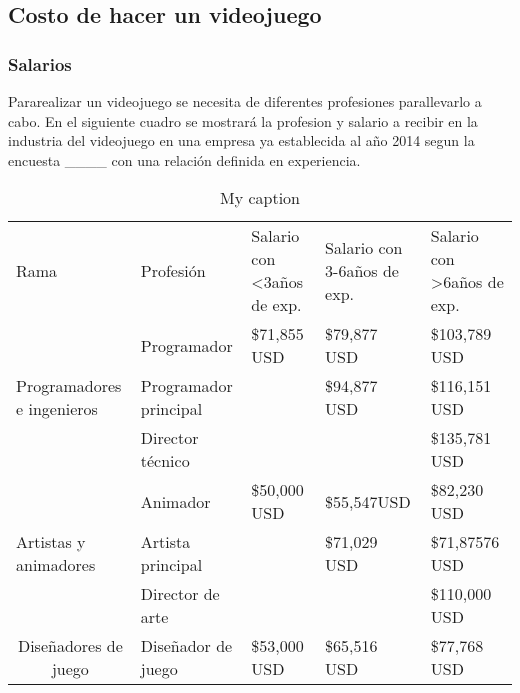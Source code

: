 \subsection{Costo de hacer un videojuego}\label{costoVJ}

	
\subsubsection{Salarios}
Pararealizar un videojuego se necesita de diferentes profesiones parallevarlo a cabo.
En el siguiente cuadro se mostrará la profesion y salario a recibir en la industria del videojuego en una empresa ya establecida al año 2014 segun la encuesta ____ con una relación definida en experiencia.


\begin{table}[]
	\centering
	\caption{My caption}
	\label{my-label}
	\begin{tabular}{lllll}
		Rama                                                      & Profesión                   & Salario con \textless 3años de exp. & Salario con 3-6años de exp. & Salario con \textgreater 6años de exp. \\
		\multirow{3}{*}{Programadores e ingenieros}               & Programador                 & \$71,855 USD                        & \$79,877 USD                & \$103,789 USD                          \\
		& Programador principal       &                                     & \$94,877 USD                & \$116,151 USD                          \\
		& Director técnico            &                                     &                             & \$135,781 USD                          \\
		\multirow{3}{*}{Artistas y animadores}                    & Animador                    & \$50,000 USD                        & \$55,547USD                 & \$82,230 USD                           \\
		& Artista principal           &                                     & \$71,029 USD                & \$71,87576 USD                         \\
		& Director de arte            &                                     &                             & \$110,000 USD                          \\
		\multicolumn{1}{c}{\multirow{2}{*}{Diseñadores de juego}} & Diseñador de juego          & \$53,000 USD                        & \$65,516 USD                & \$77,768 USD                           \\

\end{tabular}
\end{table}
